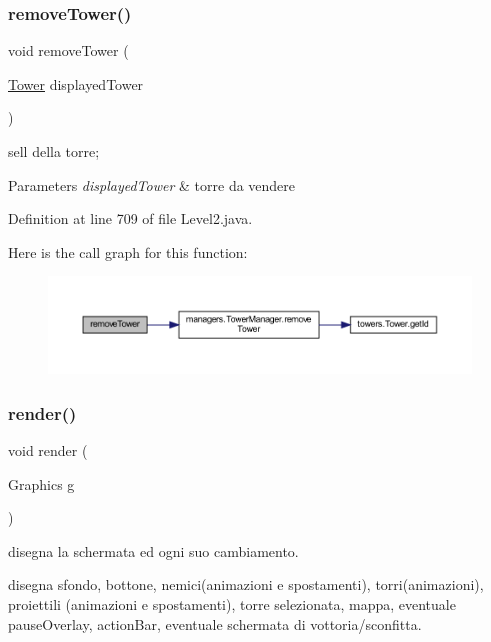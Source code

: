 \subsubsection{\texorpdfstring{remove\+Tower()}{removeTower()}}
{\footnotesize\ttfamily void remove\+Tower (\begin{DoxyParamCaption}\item[{\hyperlink{classtowers_1_1_tower}{Tower}}]{displayed\+Tower }\end{DoxyParamCaption})}



sell della torre; 


\begin{DoxyParams}{Parameters}
{\em displayed\+Tower} & torre da vendere \\
\hline
\end{DoxyParams}


Definition at line 709 of file Level2.\+java.

Here is the call graph for this function\+:\nopagebreak
\begin{figure}[H]
\begin{center}
\leavevmode
\includegraphics[width=350pt]{classscenes_1_1_level2_addba85b44e35a186e066b2e801f433c4_cgraph}
\end{center}
\end{figure}
\mbox{\label{classscenes_1_1_level2_a203b6ad9d5e4d54dd1152986eec4dedc}} 
\subsubsection{\texorpdfstring{render()}{render()}}
{\footnotesize\ttfamily void render (\begin{DoxyParamCaption}\item[{Graphics}]{g }\end{DoxyParamCaption})}



disegna la schermata ed ogni suo cambiamento. 

disegna sfondo, bottone, nemici(animazioni e spostamenti), torri(animazioni), proiettili (animazioni e spostamenti), torre selezionata, mappa, eventuale pause\+Overlay, action\+Bar, eventuale schermata di vottoria/sconfitta.


